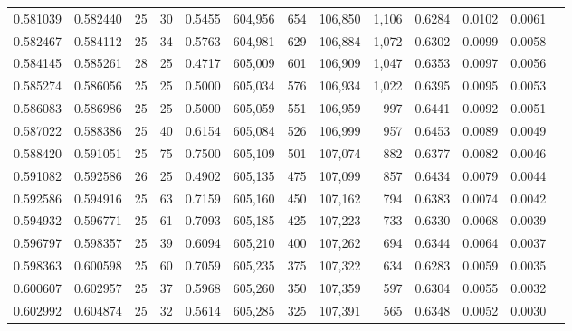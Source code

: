 \begin{tabular}{rrrrrrrrrrrrr}
0.581039 & 0.582440 &    25 &  30 &                                     0.5455 & 604,956 &     654 & 106,850 &   1,106 & 0.6284 & 0.0102 & 0.0061 \\
0.582467 & 0.584112 &    25 &  34 &                                     0.5763 & 604,981 &     629 & 106,884 &   1,072 & 0.6302 & 0.0099 & 0.0058 \\
0.584145 & 0.585261 &    28 &  25 &                                     0.4717 & 605,009 &     601 & 106,909 &   1,047 & 0.6353 & 0.0097 & 0.0056 \\
0.585274 & 0.586056 &    25 &  25 &                                     0.5000 & 605,034 &     576 & 106,934 &   1,022 & 0.6395 & 0.0095 & 0.0053 \\
0.586083 & 0.586986 &    25 &  25 &                                     0.5000 & 605,059 &     551 & 106,959 &     997 & 0.6441 & 0.0092 & 0.0051 \\
0.587022 & 0.588386 &    25 &  40 &                                     0.6154 & 605,084 &     526 & 106,999 &     957 & 0.6453 & 0.0089 & 0.0049 \\
0.588420 & 0.591051 &    25 &  75 &                                     0.7500 & 605,109 &     501 & 107,074 &     882 & 0.6377 & 0.0082 & 0.0046 \\
0.591082 & 0.592586 &    26 &  25 &                                     0.4902 & 605,135 &     475 & 107,099 &     857 & 0.6434 & 0.0079 & 0.0044 \\
0.592586 & 0.594916 &    25 &  63 &                                     0.7159 & 605,160 &     450 & 107,162 &     794 & 0.6383 & 0.0074 & 0.0042 \\
0.594932 & 0.596771 &    25 &  61 &                                     0.7093 & 605,185 &     425 & 107,223 &     733 & 0.6330 & 0.0068 & 0.0039 \\
0.596797 & 0.598357 &    25 &  39 &                                     0.6094 & 605,210 &     400 & 107,262 &     694 & 0.6344 & 0.0064 & 0.0037 \\
0.598363 & 0.600598 &    25 &  60 &                                     0.7059 & 605,235 &     375 & 107,322 &     634 & 0.6283 & 0.0059 & 0.0035 \\
0.600607 & 0.602957 &    25 &  37 &                                     0.5968 & 605,260 &     350 & 107,359 &     597 & 0.6304 & 0.0055 & 0.0032 \\
0.602992 & 0.604874 &    25 &  32 &                                     0.5614 & 605,285 &     325 & 107,391 &     565 & 0.6348 & 0.0052 & 0.0030 \\

\end{tabular}
